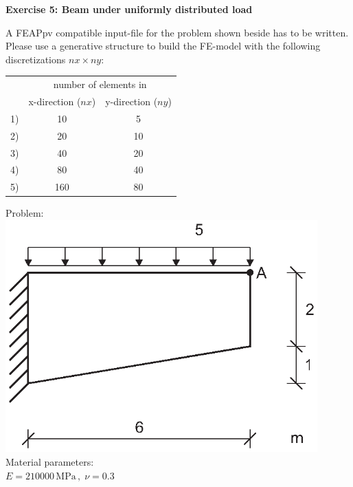 \documentclass[12pt,twoside]{article}
\begin{document}
\frenchspacing                               %

{\large\bf Exercise 5: Beam under uniformly distributed load}\medskip

\begin{minipage}[t]{0.45\textwidth}
A FEAPpv compatible input-file for the problem shown beside has to be written. Please use
a generative structure to build the FE-model with the following discretizations $nx \times ny$:
\begin{center}
\begin{tabular}{rc|c}
 & \multicolumn{2}{c}{number of elements in}\\
 & x-direction ($nx$) & y-direction ($ny$) \\\cline{2-3}
1) & 10 & 5\\
2) & 20 & 10\\
3) & 40 & 20\\
4) & 80 & 40\\
5) & 160 & 80\\
\end{tabular}
\end{center}
\end{minipage}
%
\hfill
%
\begin{minipage}[t]{0.49\textwidth}
Problem:\\
\includegraphics[width=0.9\textwidth]{beam.eps}
Material parameters:\\
$E = 210000\,\mbox{MPa} \,,\; \nu = 0.3$\bigskip
\end{minipage}
\end{document}
